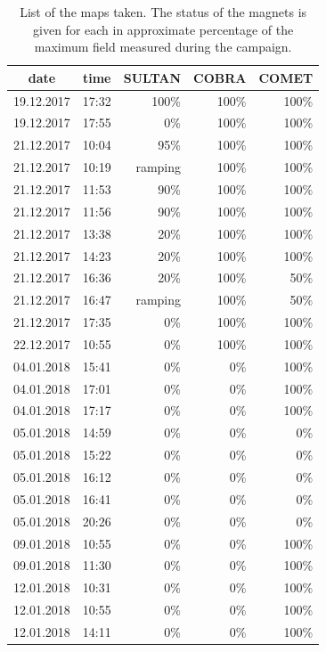 \begin{table}
  \centering
  \begin{tabular}{ccrrr}
    date        &  time   &  SULTAN   &  COBRA  &  COMET \\ \midrule
    19.12.2017  &  17:32  &  100\%    &  100\%  &  100\%  \\
    19.12.2017  &  17:55  &  0\%      &  100\%  &  100\%  \\
    21.12.2017  &  10:04  &  95\%     &  100\%  &  100\%  \\
    21.12.2017  &  10:19  &  ramping  &  100\%  &  100\%  \\
    21.12.2017  &  11:53  &  90\%     &  100\%  &  100\%  \\
    21.12.2017  &  11:56  &  90\%     &  100\%  &  100\%  \\
    21.12.2017  &  13:38  &  20\%     &  100\%  &  100\%  \\
    21.12.2017  &  14:23  &  20\%     &  100\%  &  100\%  \\
    21.12.2017  &  16:36  &  20\%     &  100\%  &  50\%   \\
    21.12.2017  &  16:47  &  ramping  &  100\%  &  50\%   \\
    21.12.2017  &  17:35  &  0\%      &  100\%  &  100\%  \\
    22.12.2017  &  10:55  &  0\%      &  100\%  &  100\%  \\
    04.01.2018  &  15:41  &  0\%      &  0\%    &  100\%  \\
    04.01.2018  &  17:01  &  0\%      &  0\%    &  100\%  \\
    04.01.2018  &  17:17  &  0\%      &  0\%    &  100\%  \\
    05.01.2018  &  14:59  &  0\%      &  0\%    &  0\%    \\
    05.01.2018  &  15:22  &  0\%      &  0\%    &  0\%    \\
    05.01.2018  &  16:12  &  0\%      &  0\%    &  0\%    \\
    05.01.2018  &  16:41  &  0\%      &  0\%    &  0\%    \\
    05.01.2018  &  20:26  &  0\%      &  0\%    &  0\%    \\
    09.01.2018  &  10:55  &  0\%      &  0\%    &  100\%  \\
    09.01.2018  &  11:30  &  0\%      &  0\%    &  100\%  \\
    12.01.2018  &  10:31  &  0\%      &  0\%    &  100\%  \\
    12.01.2018  &  10:55  &  0\%      &  0\%    &  100\%  \\
    12.01.2018  &  14:11  &  0\%      &  0\%    &  100\%  \\
  \end{tabular}
  \caption{List of the maps taken. The status of the magnets is given for each in approximate percentage of the maximum field measured during the campaign.}\label{tab:psi_mapping_maps}
\end{table}




